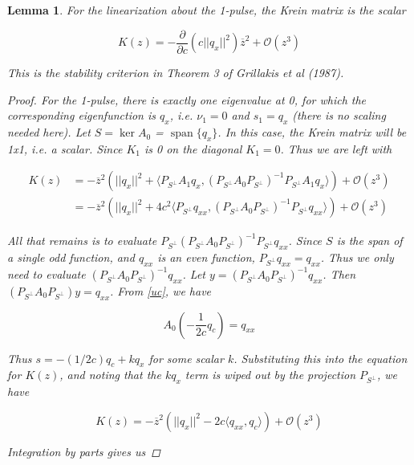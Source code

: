 \documentclass[12pt]{article}
\DeclareMathOperator{\spn}{span}
\newtheorem{lemma}{Lemma}
\begin{document}
\begin{lemma}\label{Krein1pulse}
For the linearization about the 1-pulse, the Krein matrix is the scalar

\begin{equation}
K(z) = -\frac{\partial}{\partial c} \left( c||q_x||^2 \right) \overline{z}^2 + \mathcal{O}(z^3)
\end{equation}

This is the stability criterion in Theorem 3 of Grillakis et al (1987).

\begin{proof}

For the 1-pulse, there is exactly one eigenvalue at 0, for which the corresponding eigenfunction is $q_x$, i.e. $\nu_1 = 0$ and $s_1 = q_x$ (there is no scaling needed here). Let $S = \ker A_0$ = $\spn \{q_x\}$. In this case, the Krein matrix will be 1x1, i.e. a scalar. Since $K_1$ is 0 on the diagonal $K_1 = 0$. Thus we are left with

\begin{align*}
K(z) &= -\overline{z}^2 \left( ||q_x||^2 + \langle P_{S^\perp} A_1 q_x, (P_{S^\perp} A_0 P_{S^\perp})^{-1} P_{S^\perp} A_1 q_x \rangle \right) + \mathcal{O}(z^3) \\
&= -\overline{z}^2 \left( ||q_x||^2 + 4 c^2 \langle P_{S^\perp} q_{xx}, (P_{S^\perp} A_0 P_{S^\perp})^{-1} P_{S^\perp} q_{xx} \rangle \right) + \mathcal{O}(z^3)
\end{align*}

All that remains is to evaluate $P_{S^\perp} (P_{S^\perp} A_0 P_{S^\perp})^{-1} P_{S^\perp} q_{xx}$. Since $S$ is the span of a single odd function, and $q_{xx}$ is an even function, $P_{S^\perp} q_{xx} = q_{xx}$. Thus we only need to evaluate $(P_{S^\perp} A_0 P_{S^\perp})^{-1} q_{xx}$. Let $y = (P_{S^\perp} A_0 P_{S^\perp})^{-1} q_{xx}$. Then $(P_{S^\perp} A_0 P_{S^\perp})y = q_{xx}$. From \eqref{uc}, we have

\begin{equation*}\label{uc}
A_0 \left( -\frac{1}{2c} q_c \right) = q_{xx}
\end{equation*}

Thus $s = -(1/2c) q_c + k q_x$ for some scalar $k$. Substituting this into the equation for $K(z)$, and noting that the $k q_x$ term is wiped out by the projection $P_{S^\perp}$, we have

\[
K(z) = -\overline{z}^2 \left( ||q_x||^2 - 2c \langle q_{xx}, q_c \rangle \right) + \mathcal{O}(z^3)
\]

Integration by parts gives us


\end{proof}
\end{lemma}
\end{document}
